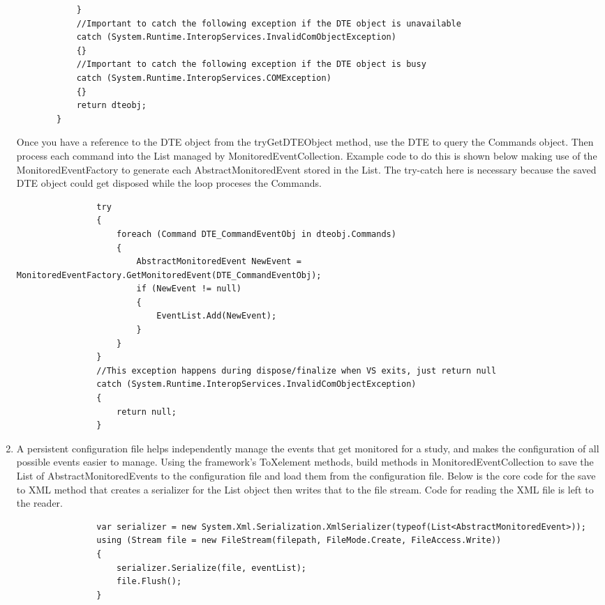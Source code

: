 \begin{Exercise}[ type={program}, difficulty={1}]
\begin{enumerate}
\begin{lstlisting}
			}
			//Important to catch the following exception if the DTE object is unavailable
			catch (System.Runtime.InteropServices.InvalidComObjectException)
			{} 
			//Important to catch the following exception if the DTE object is busy
			catch (System.Runtime.InteropServices.COMException)
			{}
			return dteobj;
		}

\end{lstlisting}

Once you have a reference to the DTE object from the tryGetDTEObject method, use the DTE to query the Commands  object.  Then process each command into the List managed by MonitoredEventCollection.  Example code to do this is shown below making use of the MonitoredEventFactory to generate each AbstractMonitoredEvent stored in the List.  The try-catch here is necessary because the saved DTE object could get disposed while the loop proceses the Commands.

\begin{lstlisting}
                try
                {
                    foreach (Command DTE_CommandEventObj in dteobj.Commands)
                    {
                        AbstractMonitoredEvent NewEvent = MonitoredEventFactory.GetMonitoredEvent(DTE_CommandEventObj);
                        if (NewEvent != null)
                        {
                            EventList.Add(NewEvent);
                        }
                    }
                }
                //This exception happens during dispose/finalize when VS exits, just return null
                catch (System.Runtime.InteropServices.InvalidComObjectException)
                {
                    return null;
                }
\end{lstlisting}

\item
A persistent configuration file helps independently manage the events that get monitored for a study, and makes the configuration of all possible events easier to manage.    Using the framework's ToXelement methods, build methods in MonitoredEventCollection to save the List of AbstractMonitoredEvents to the configuration file and load them from the configuration file.  Below is the core code for the save to XML method that creates a serializer for the List object then writes that to the file stream.  Code for reading the XML file is left to the reader.

\begin{lstlisting}
                var serializer = new System.Xml.Serialization.XmlSerializer(typeof(List<AbstractMonitoredEvent>));
                using (Stream file = new FileStream(filepath, FileMode.Create, FileAccess.Write))
                {
                    serializer.Serialize(file, eventList);
                    file.Flush();
                }
\end{lstlisting}

\end{enumerate}



\end{Exercise}

